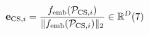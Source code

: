 \documentclass[preview,border=3pt]{standalone}
\begin{document}
\begin{minipage}{3.42in}
\fontsize{12.5pt}{15.5pt}\selectfont
\begin{equation*}
\mathbf{e}_{\mathrm{CS}, i} = \frac{f_{\mathrm{emb}}(\mathcal{P}_{\mathrm{CS}, i})}{\|f_{\mathrm{emb}}(\mathcal{P}_{\mathrm{CS}, i})\|_2} \in \mathbb{R}^D \hfill (7)
\end{equation*}
\end{minipage}
\end{document}
